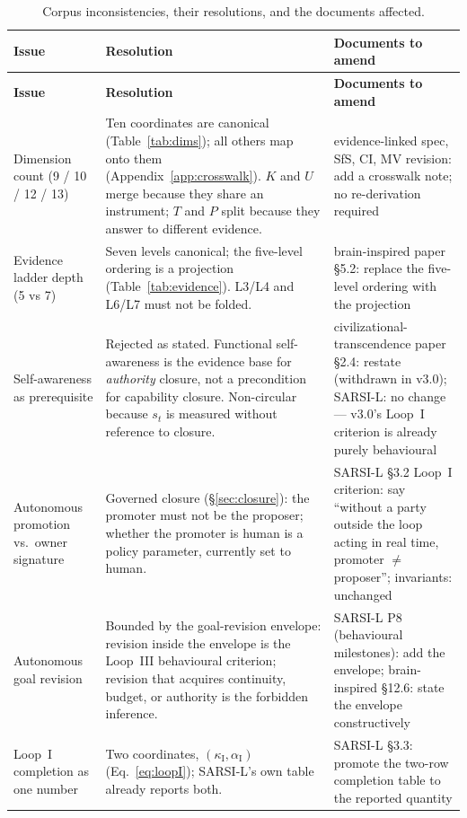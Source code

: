 \documentclass[11pt]{article}
\begin{document}
\begin{longtable}{p{2.6cm} p{5.6cm} p{6.4cm}}
\caption{Corpus inconsistencies, their resolutions, and the documents affected.}
\label{tab:register}\\
\toprule
\textbf{Issue} & \textbf{Resolution} & \textbf{Documents to amend} \\
\midrule
\endfirsthead
\toprule
\textbf{Issue} & \textbf{Resolution} & \textbf{Documents to amend} \\
\midrule
\endhead
\bottomrule
\endfoot
Dimension count (9 / 10 / 12 / 13) & Ten coordinates are canonical (Table~\ref{tab:dims}); all others map onto them (Appendix~\ref{app:crosswalk}). $K$ and $U$ merge because they share an instrument; $T$ and $P$ split because they answer to different evidence. & evidence-linked spec, SfS, CI, MV revision: add a crosswalk note; no re-derivation required \\
Evidence ladder depth (5 vs 7) & Seven levels canonical; the five-level ordering is a projection (Table~\ref{tab:evidence}). L3/L4 and L6/L7 must not be folded. & brain-inspired paper \S5.2: replace the five-level ordering with the projection \\
Self-awareness as prerequisite & Rejected as stated. Functional self-awareness is the evidence base for \emph{authority} closure, not a precondition for capability closure. Non-circular because $s_t$ is measured without reference to closure. & civilizational-transcendence paper \S2.4: restate (withdrawn in v3.0); SARSI-L: no change --- v3.0's Loop~I criterion is already purely behavioural \\
Autonomous promotion vs.\ owner signature & Governed closure (\S\ref{sec:closure}): the promoter must not be the proposer; whether the promoter is human is a policy parameter, currently set to human. & SARSI-L \S3.2 Loop~I criterion: say ``without a party outside the loop acting in real time, promoter $\ne$ proposer''; invariants: unchanged \\
Autonomous goal revision & Bounded by the goal-revision envelope: revision inside the envelope is the Loop~III behavioural criterion; revision that acquires continuity, budget, or authority is the forbidden inference. & SARSI-L P8 (behavioural milestones): add the envelope; brain-inspired \S12.6: state the envelope constructively \\
Loop~I completion as one number & Two coordinates, $(\kappa_{\mathrm{I}}, \alpha_{\mathrm{I}})$ (Eq.~\ref{eq:loopI}); SARSI-L's own table already reports both. & SARSI-L \S3.3: promote the two-row completion table to the reported quantity \\

\end{longtable}
\end{document}
